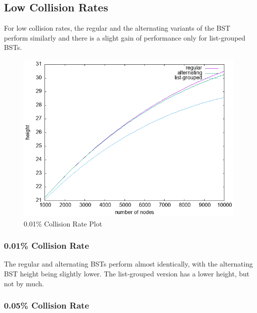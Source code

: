 \documentclass[fleqn,10pt]{SelfArx} %
\begin{document}
\subsection{Low Collision Rates}
For low collision rates, the regular and the alternating variants of the BST perform similarly and there is a slight gain of performance only for list-grouped BSTs.

\begin{figure}[ht]\centering
	\includegraphics[width=\linewidth]{Figures/0.01_plot.png}
	\caption{0.01\% Collision Rate Plot}
	\label{fig:0.01_plot}
\end{figure}


\subsubsection{0.01\% Collision Rate}

The regular and alternating BSTs perform almost identically, with the alternating BST height being slightly lower. The list-grouped version has a lower height, but not by much.

\subsubsection{0.05\% Collision Rate}
\end{document}
